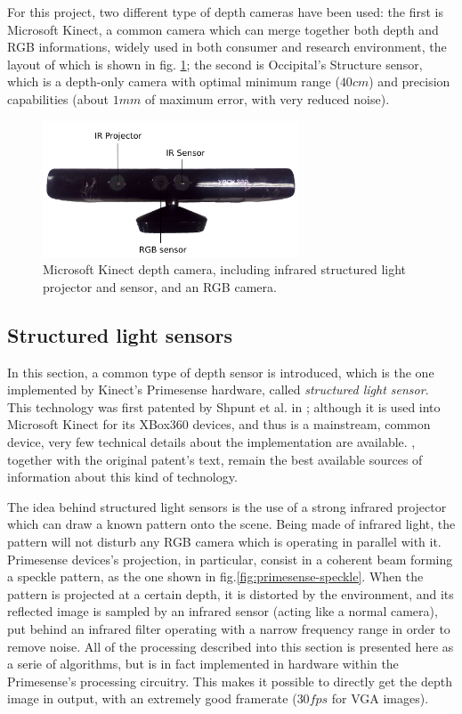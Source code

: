 For this project, two different type of depth cameras have been used: the first
is Microsoft Kinect, a common camera which can merge together both depth and RGB
informations, widely used in both consumer and research environment,
the layout of which is shown in fig. \ref{fig:kinect}; the second is Occipital's
Structure sensor, which is a depth-only camera with optimal minimum range
($40\unit{cm}$) and precision capabilities (about $1\unit{mm}$ of maximum error,
with very reduced noise).

\begin{figure}[htbp]
\centering
\includegraphics[width=3in]{./Graphics/kinect}
\caption{Microsoft Kinect depth camera, including infrared structured light
projector and sensor, and an RGB camera.\label{fig:kinect}}
\end{figure}

\subsection{Structured light sensors}
In this section, a common type of depth sensor is introduced, which is the one
implemented by Kinect's Primesense hardware, called \emph{structured light
sensor}. This technology was first patented by Shpunt et al. in
\cite{primesense-patent}; although it is used into Microsoft Kinect for its
XBox360 devices, and thus is a mainstream, common device, very few technical
details about the implementation are available. \cite{how-kinect-work}, together
with the original patent's text, remain the best available sources of
information about this kind of technology.

The idea behind structured light sensors is the use of a strong infrared projector
which can draw a known pattern onto the scene. Being made of infrared light,
the pattern will not disturb any RGB camera which is operating in parallel with
it. Primesense devices's projection, in particular, consist in a coherent beam
forming a speckle pattern, as the one shown
in fig.\ref{fig:primesense-speckle}. When the pattern is projected at a certain
depth, it is distorted by the environment, and its reflected image is sampled
by an infrared sensor (acting like a normal camera), put behind an infrared
filter operating with a narrow frequency range in order to remove noise. All of
the processing described into this section is presented here as a serie of
algorithms, but is in fact implemented in hardware within the Primesense's
processing circuitry. This makes it possible to directly get the depth image in
output, with an extremely good framerate ($30\unit{fps}$ for VGA images).

